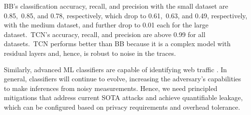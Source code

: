 %
BB's classification accuracy, recall, and precision with the small dataset are
0.85,~0.85, and 0.78, respectively, which drop to
0.61,~0.63, and 0.49, respectively, with the medium dataset, and further
drop to 0.01 each for the large dataset.~TCN's accuracy, recall, and precision
are above 0.99 for all datasets.~TCN performs better than BB because it
is a complex model with residual layers and, hence, is robust to noise in the
traces.
%

%
%

Similarly, advanced ML classifiers are capable of identifying web traffic
\cite{bhat2019varcnn, sirinam2018df}.
%
In general, classifiers will continue to evolve,
increasing the adversary's capabilities to make inferences from noisy
measurements.
Hence, we need principled mitigations that address
current SOTA attacks and achieve quantifiable
leakage, which can be configured based on privacy
requirements and overhead tolerance.

